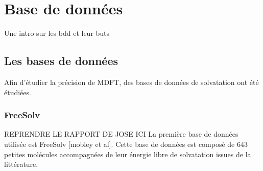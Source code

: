 \chapter{Base de données}



Une intro sur les bdd et leur buts


\section{Les bases de données}
Afin d'étudier la précision de MDFT, des bases de données de solvatation ont été étudiées.
\subsection{FreeSolv}
REPRENDRE LE RAPPORT DE JOSE ICI
La première base de données utilisée est FreeSolv [mobley et al]. Cette base de données est composé de 643 petites molécules accompagnées de leur énergie libre de solvatation issues de la littérature.
